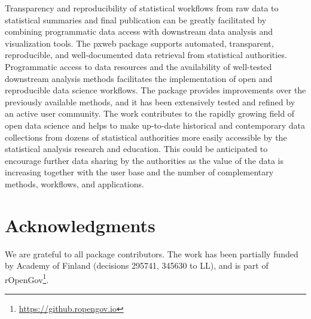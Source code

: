 
Transparency and reproducibility of statistical workflows from raw
data to statistical summaries and final publication can be greatly
facilitated by combining programmatic data access with downstream data
analysis and visualization tools. The pxweb package supports
automated, transparent, reproducible, and well-documented data
retrieval from statistical authorities. Programmatic access to data
resources and the availability of well-tested downstream analysis
methods facilitates the implementation of open and reproducible data
science workflows. The  package provides improvements
over the previously available methods, and it has been extensively
tested and refined by an active user community. The work contributes
to the rapidly growing field of open data science \cite{Lahti2018IDA,
xxx} and helps to make up-to-date historical and contemporary data
collections from dozens of statistical authorities more easily
accessible by the statistical analysis research and education. This
could be anticipated to encourage further data sharing by the
authorities as the value of the data is increasing together with the
user base and the number of complementary methods, workflows, and
applications.



\section*{Acknowledgments}

We are grateful to all package contributors. The work has been
partially funded by Academy of Finland (decisions 295741, 345630 to
LL), and is part of
rOpenGov\footnote{\url{https://github.ropengov.io}}.




  

\address{M\r{a}ns Magnusson\\
  Department of Computer Science\\
  Aalto University\\
  Finland\\}


\address{Leo Lahti\\
  Department of Computing\\
  PO Box 20014 University of Turku\\
  Finland\\}
